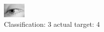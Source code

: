 \begin{figure}[h!]
\begin{center}
\includegraphics[width=0.60\columnwidth]{figures/ID2979_class_3_target_4.png}
\end{center}
\caption{ Classification: 3 actual target: 4}
\label{fig:ID2979_class_3_target_4}
\end{figure}
